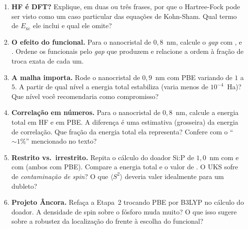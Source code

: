 \begin{enumerate}[leftmargin=*,label=\textbf{5.\arabic*}]
  \item \textbf{HF é DFT?} Explique, em duas ou três frases, por que o Hartree-Fock
        pode ser visto como um caso particular das equações de Kohn-Sham. Qual
        termo de $E_{\text{xc}}$ ele inclui e qual ele omite?

  \item \textbf{O efeito do funcional.} Para o nanocristal de $0{,}8$~nm, calcule o
        \emph{gap} com ,  e . Ordene os
        funcionais pelo \emph{gap} que produzem e relacione a ordem à fração de
        troca exata de cada um.

  \item \textbf{A malha importa.} Rode o nanocristal de $0{,}9$~nm com PBE variando
         de $1$ a $5$. A partir de qual nível a energia total
        estabiliza (varia menos de $10^{-4}$~Ha)? Que nível você recomendaria como
        compromisso?

  \item \textbf{Correlação em números.} Para o nanocristal de $0{,}8$~nm, calcule a
        energia total em HF e em PBE. A diferença é uma estimativa (grosseira) da
        energia de correlação. Que fração da energia total ela representa? Confere
        com o ``$\sim 1\%$'' mencionado no texto?

  \item \textbf{Restrito vs.\ irrestrito.} Repita o cálculo do doador Si:P de
        $1{,}0$~nm com  e com  (ambos com PBE). Compare
        a energia total e o valor de . O UKS sofre de
        \emph{contaminação de spin}? O que $\langle S^2\rangle$ deveria valer
        idealmente para um dubleto?

  \item \textbf{Projeto Âncora.} Refaça a Etapa~2 trocando PBE por B3LYP no cálculo
         do doador. A densidade de spin sobre o fósforo muda muito? O
        que isso sugere sobre a robustez da localização do \qubit{} frente à
        escolha do funcional?
\end{enumerate}
